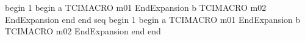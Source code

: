begin
1
begin
a
TCIMACRO
m01
EndExpansion
b
TCIMACRO
m02
EndExpansion
end
end
seq
begin
1
begin
a
TCIMACRO
m01
EndExpansion
b
TCIMACRO
m02
EndExpansion
end
end
